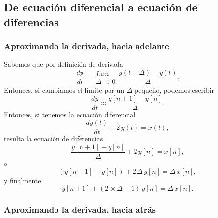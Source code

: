 \subsection{De ecuación diferencial a ecuación de diferencias}

\subsubsection{Aproximando la derivada, hacia adelante}

Sabemos que por definición de derivada
\begin{equation}
 \frac{dy}{dt} = \begin{array}{c}
                  Lim \\
                  \Delta \rightarrow 0
                 \end{array}
                 \frac{y(t+\Delta) - y(t)}{\Delta}.
\end{equation}
Entonces, si cambiamos el límite por un $\Delta$ pequeño, podemos escribir
\begin{equation}
 \frac{dy}{dt} \approx \frac{y[n+1] - y[n]}{\Delta}.
\end{equation}
Entonces, si tenemos la ecuación diferencial
\begin{equation}
 \frac{dy(t)}{dt} + 2 \, y(t) = x(t),
\end{equation}
resulta la ecuación de diferencias
\begin{equation}
 \frac{y[n+1] - y[n]}{\Delta} + 2 \, y[n] = x[n],
\end{equation}
o
\begin{equation}
(y[n+1] - y[n]) + 2 \,  \Delta \, y[n] = \Delta \, x[n],
\end{equation}
y finalmente
\begin{equation}
y[n+1] + (2 \, \times \Delta - 1) \, y[n] = \Delta \, x[n].
\end{equation}

\subsubsection{Aproximando la derivada, hacia atrás}


